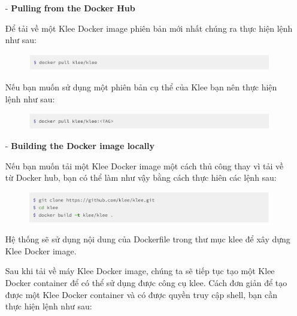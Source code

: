 \documentclass[12pt,a4paper]{report}
\begin{document}
\begin{itemize}
\item[-] \textbf{Pulling from the Docker Hub}

Để tải về một Klee Docker image phiên bản mới nhất chúng ra thực hiện lệnh như sau:

\begin{figure}[ht]
\begin{center}
\includegraphics[scale=.3]{hinhanh/pulldocker.png}
\end{center}
\end{figure} \newpage

Nếu bạn muốn sử dụng một phiên bản cụ thể của Klee bạn nên thực hiện lệnh như sau:

\begin{figure}[ht]
\begin{center}
\includegraphics[scale=.3]{hinhanh/pulldockertag.png}
\end{center}
\end{figure}

\item[-] \textbf{Building the Docker image locally}

Nếu bạn muốn tải một Klee Docker image một cách thủ công thay vì tải về từ Docker hub, bạn có thể làm như vậy bằng cách thực hiên các lệnh sau:

\begin{figure}[ht]
\begin{center}
\includegraphics[scale=0.3]{hinhanh/builddockerlocal.png}
\end{center}
\end{figure}

Hệ thống sẽ sử dụng nội dung của Dockerfile trong thư mục klee để xây dựng Klee Docker image.

Sau khi tải về máy Klee Docker image, chúng ta sẽ tiếp tục tạo một Klee Docker container để có thể  sử dụng được công cụ klee. Cách đơn giản để tạo được một Klee Docker container và có được quyền truy cập shell, bạn cần thực hiện lệnh như sau:


\end{itemize}
\end{document}
